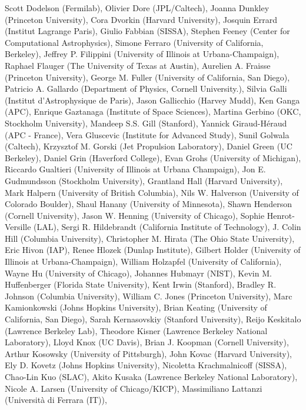 Scott Dodelson (Fermilab),
Olivier Dore (JPL/Caltech),
Joanna Dunkley (Princeton University),
Cora Dvorkin (Harvard University),
Josquin Errard (Institut Lagrange Paris),
Giulio Fabbian (SISSA),
Stephen Feeney (Center for Computational Astrophysics),
Simone Ferraro (University of California, Berkeley),
Jeffrey P. Filippini (University of Illinois at Urbana-Champaign),
Raphael Flauger (The University of Texas at Austin),
Aurelien A. Fraisse (Princeton University),
George M. Fuller (University of California, San Diego),
Patricio A. Gallardo (Department of Physics, Cornell University.),
Silvia Galli (Institut d'Astrophysique de Paris),
Jason Gallicchio (Harvey Mudd),
Ken Ganga (APC),
Enrique Gaztanaga (Institute of Space Sciences),
Martina Gerbino (OKC, Stockholm University),
Mandeep S.S. Gill (Stanford),
Yannick Giraud-Héraud (APC - France),
Vera Gluscevic (Institute for Advanced Study),
Sunil Golwala (Caltech),
Krzysztof M. Gorski (Jet Propulsion Laboratory),
Daniel Green (UC Berkeley),
Daniel Grin (Haverford College),
Evan Grohs (University of Michigan),
Riccardo Gualtieri (University of Illinois at Urbana Champaign),
Jon E. Gudmundsson (Stockholm University),
Grantland Hall (Harvard University),
Mark Halpern (University of British Columbia),
Nils W. Halverson (University of Colorado Boulder),
Shaul Hanany (University of Minnesota),
Shawn Henderson (Cornell University),
Jason W. Henning (University of Chicago),
Sophie Henrot-Versille (LAL),
Sergi R. Hildebrandt (California Institute of Technology),
J. Colin Hill (Columbia University),
Christopher M. Hirata (The Ohio State University),
Eric Hivon (IAP),
Renee Hlozek (Dunlap Institute),
Gilbert Holder (University of Illinois at Urbana-Champaign),
William Holzapfel (University of California),
Wayne Hu (University of Chicago),
Johannes Hubmayr (NIST),
Kevin M. Huffenberger (Florida State University),
Kent Irwin (Stanford),
Bradley R. Johnson (Columbia University),
William C. Jones (Princeton University),
Marc Kamionkowski (Johns Hopkins University),
Brian Keating (University of California, San Diego),
Sarah Kernasovskiy (Stanford University),
Reijo Keskitalo (Lawrence Berkeley Lab),
Theodore Kisner (Lawrence Berkeley National Laboratory),
Lloyd Knox (UC Davis),
Brian J. Koopman (Cornell University),
Arthur Kosowsky (University of Pittsburgh),
John Kovac (Harvard University),
Ely D. Kovetz (Johns Hopkins University),
Nicoletta Krachmalnicoff (SISSA),
Chao-Lin Kuo (SLAC),
Akito Kusaka (Lawrence Berkeley National Laboratory),
Nicole A. Larsen (University of Chicago/KICP),
Massimiliano Lattanzi (Università di Ferrara (IT)),
